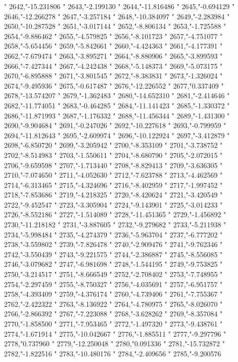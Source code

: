 "
2642,"-15.231806
"
2643,"-2.199130
"
2644,"-11.816486
"
2645,"-0.694129
"
2646,"-12.266278
"
2647,"-3.257184
"
2648,"-10.384097
"
2649,"-2.283984
"
2650,"-10.287528
"
2651,"-3.017144
"
2652,"-8.806134
"
2653,"-1.725588
"
2654,"-9.886462
"
2655,"-4.579825
"
2656,"-8.101723
"
2657,"-4.751077
"
2658,"-5.654456
"
2659,"-5.842661
"
2660,"-4.424363
"
2661,"-4.177391
"
2662,"-7.679474
"
2663,"-3.895271
"
2664,"-8.880906
"
2665,"-3.899593
"
2666,"-7.427344
"
2667,"-4.242438
"
2668,"-5.148373
"
2669,"-5.073175
"
2670,"-6.895888
"
2671,"-3.801545
"
2672,"-8.383831
"
2673,"-1.326024
"
2674,"-9.495936
"
2675,"-0.617487
"
2676,"-12.226552
"
2677,"0.337409
"
2678,"-13.574207
"
2679,"-1.362483
"
2680,"-14.652310
"
2681,"-2.414646
"
2682,"-11.774051
"
2683,"-0.464285
"
2684,"-11.141423
"
2685,"-1.330372
"
2686,"-11.871993
"
2687,"-1.176332
"
2688,"-11.456344
"
2689,"-1.431300
"
2690,"-9.904684
"
2691,"-0.247026
"
2692,"-10.227618
"
2693,"-0.799959
"
2694,"-11.812643
"
2695,"-2.609974
"
2696,"-10.122924
"
2697,"-3.412879
"
2698,"-6.850720
"
2699,"-3.205942
"
2700,"-8.353109
"
2701,"-3.738752
"
2702,"-8.514983
"
2703,"-1.550611
"
2704,"-8.680790
"
2705,"-2.072015
"
2706,"-9.659598
"
2707,"-1.713440
"
2708,"-8.829413
"
2709,"-3.636305
"
2710,"-7.074650
"
2711,"-4.052630
"
2712,"-7.623788
"
2713,"-4.462569
"
2714,"-6.313465
"
2715,"-4.324696
"
2716,"-8.402959
"
2717,"-1.997452
"
2718,"-7.853686
"
2719,"-4.218325
"
2720,"-8.420624
"
2721,"-3.420549
"
2722,"-9.452547
"
2723,"-3.305904
"
2724,"-9.143901
"
2725,"-3.014233
"
2726,"-8.552186
"
2727,"-1.514089
"
2728,"-11.451365
"
2729,"-1.456892
"
2730,"-11.218182
"
2731,"-3.887605
"
2732,"-9.279682
"
2733,"-5.211938
"
2734,"-5.998484
"
2735,"-4.274379
"
2736,"-5.963704
"
2737,"-6.777202
"
2738,"-3.559802
"
2739,"-7.826478
"
2740,"-2.909476
"
2741,"-9.762346
"
2742,"-3.550439
"
2743,"-9.221575
"
2744,"-2.386887
"
2745,"-8.556085
"
2746,"-3.079682
"
2747,"-6.981698
"
2748,"-1.544195
"
2749,"-9.753825
"
2750,"-3.214517
"
2751,"-8.666549
"
2752,"-2.708402
"
2753,"-7.748955
"
2754,"-2.297459
"
2755,"-8.750327
"
2756,"-4.035691
"
2757,"-6.951757
"
2758,"-4.393409
"
2759,"-4.376174
"
2760,"-4.739406
"
2761,"-7.755367
"
2762,"-2.422322
"
2763,"-8.136922
"
2764,"-4.780975
"
2765,"-8.026070
"
2766,"-2.866392
"
2767,"-7.223088
"
2768,"-3.628262
"
2769,"-8.357084
"
2770,"-1.858500
"
2771,"-7.953465
"
2772,"-1.497320
"
2773,"-9.438761
"
2774,"-1.671914
"
2775,"-10.042667
"
2776,"-1.885511
"
2777,"-9.297796
"
2778,"0.737960
"
2779,"-12.250048
"
2780,"0.091336
"
2781,"-15.732872
"
2782,"-1.822516
"
2783,"-10.480176
"
2784,"-2.409656
"
2785,"-9.200576
